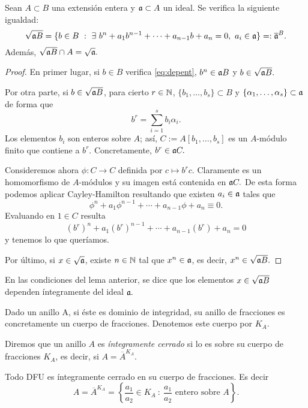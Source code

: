 \documentclass[../main.tex]{subfiles}
\begin{document}
	\begin{lemma}\label{lemma:idext}
		Sean $A\subset B$ una extensión entera y $\mathfrak{a}\subset A$ un ideal. Se verifica la siguiente igualdad:
		$$\sqrt{\mathfrak{a} B}=\{b\in B\ :\ \exists\ b^n+a_1 b^{n-1}+\cdots+a_{n-1}b+a_n=0,\ a_i\in\mathfrak{a}\}=:\overline{\mathfrak{a}}^B.$$
		Además, $\sqrt{\mathfrak{a} B}\cap A=\sqrt{\mathfrak{a}}.$
	\end{lemma}
	\begin{proof}
		En primer lugar, si $b\in B$ verifica \ref{eq:depent}, $b^n\in\mathfrak{a} B$ y $b\in\sqrt{\mathfrak{a} B}.$
		
		Por otra parte, si $b\in\sqrt{\mathfrak{a} B}$, para cierto $r\in\mathbb{N}$, $\{b_1,\dots,b_s\}\subset B$ y $\{\alpha_1,\dots,\alpha_s\}\subset\mathfrak{a}$ de forma que
		$$b^r=\sum_{i=1}^sb_i\alpha_i.$$
		Los elementos $b_i$ son enteros sobre $A$; así, $C:=A[b_1,\dots,b_s]$ es un $A$-módulo finito que contiene a $b^r.$ Concretamente, $b^r\in\mathfrak{a} C.$
		
		Consideremos ahora $\phi: C\rightarrow C$ definida por $c\mapsto b^r c.$ Claramente es un homomorfismo de $A$-módulos y su imagen está contenida en $\mathfrak{a} C. $ De esta forma podemos aplicar Cayley-Hamilton resultando que existen $a_i\in\mathfrak{a}$ tales que
		$$\phi^n+a_1\phi^{n-1}+\cdots+a_{n-1}\phi+a_n\equiv 0.$$
		Evaluando en $1\in C$ resulta
		$$(b^r)^n+a_1(b^r)^{n-1}+\cdots+a_{n-1}(b^r)+a_n= 0$$
		y tenemos lo que queríamos.
		
		Por último, si $x\in\sqrt{\mathfrak{a}}$, existe $n\in\mathbb{N}$ tal que $x^n\in\mathfrak{a}$, es decir, $x^n\in\sqrt{\mathfrak{a} B}.$
	\end{proof}
	
	\begin{definition}
		En las condiciones del lema anterior, se dice que los elementos $x\in\sqrt{\mathfrak{a} B}$ dependen íntegramente del ideal $\mathfrak{a}.$
	\end{definition}
	
	Dado un anillo A, si éste es dominio de integridad, su anillo de fracciones es concretamente un cuerpo de fracciones. Denotemos este cuerpo por $K_A.$
	
	\begin{definition}
		Diremos que un anillo $A$ es \textit{íntegramente cerrado} si lo es sobre su cuerpo de fracciones $K_A$, es decir, si $A=\overline{A}^{K_A}.$
	\end{definition}
	
	\begin{lemma}
		Todo DFU es íntegramente cerrado en su cuerpo de fracciones. Es decir
		$$A=\overline{A}^{K_A}=\left\{\frac{a_1}{a_2}\in K_A\ :\ \frac{a_1}{a_2}\text{ entero sobre }A\right\}.$$
	\end{lemma}
	
\end{document}
